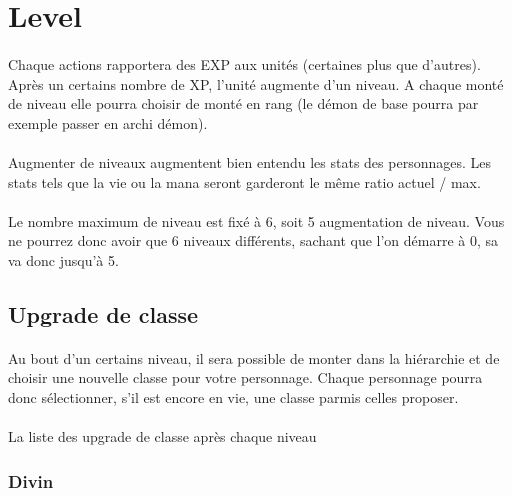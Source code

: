 \newpage
\section{Level}

\paragraph{} Chaque actions rapportera des EXP aux unités (certaines plus que d'autres). Après un certains nombre de XP, l'unité augmente d'un niveau. A chaque monté de niveau elle pourra choisir de monté en rang (le démon de base pourra par exemple passer en archi démon).

\paragraph{} Augmenter de niveaux augmentent bien entendu les stats des personnages. Les stats tels que la vie ou la mana seront garderont le même ratio actuel / max.

\paragraph{} Le nombre maximum de niveau est fixé à 6, soit 5 augmentation de niveau. Vous ne pourrez donc avoir que 6 niveaux différents, sachant que l'on démarre à 0, sa va donc jusqu'à 5.

\subsection{Upgrade de classe}

\paragraph{} Au bout d'un certains niveau, il sera possible de monter dans la hiérarchie et de choisir une nouvelle classe pour votre personnage. Chaque personnage pourra donc sélectionner, s'il est encore en vie, une classe parmis celles proposer.

\paragraph{} La liste des upgrade de classe après chaque niveau

\subsubsection{Divin}

